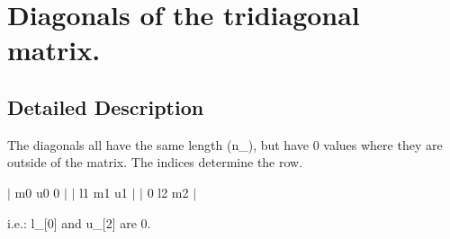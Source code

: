 \hypertarget{group__Diagonals}{\section{Diagonals of the tridiagonal matrix.}
\label{group__Diagonals}
}


\subsection{Detailed Description}
The diagonals all have the same length (n\-\_\-), but have 0 values where they are outside of the matrix. The indices determine the row.

$\vert$ m0 u0 0 $\vert$ $\vert$ l1 m1 u1 $\vert$ $\vert$ 0 l2 m2 $\vert$

i.\-e.\-: l\-\_\-\mbox{[}0\mbox{]} and u\-\_\-\mbox{[}2\mbox{]} are 0. 
